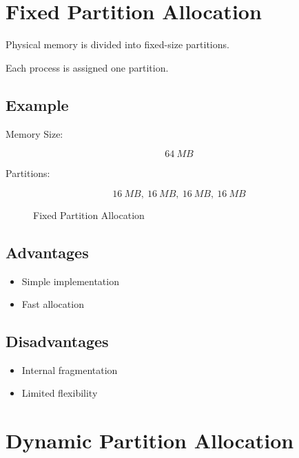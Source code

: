 \section{Fixed Partition Allocation}

Physical memory is divided into fixed-size partitions.

Each process is assigned one partition.

\subsection{Example}

Memory Size:

\[
64\ MB
\]

Partitions:

\[
16\ MB,\ 16\ MB,\ 16\ MB,\ 16\ MB
\]

\begin{figure}[H]
\centering
{}
\caption{Fixed Partition Allocation}
\end{figure}

\subsection{Advantages}

\begin{itemize}
\item Simple implementation
\item Fast allocation
\end{itemize}

\subsection{Disadvantages}

\begin{itemize}
\item Internal fragmentation
\item Limited flexibility
\end{itemize}

\section{Dynamic Partition Allocation}

